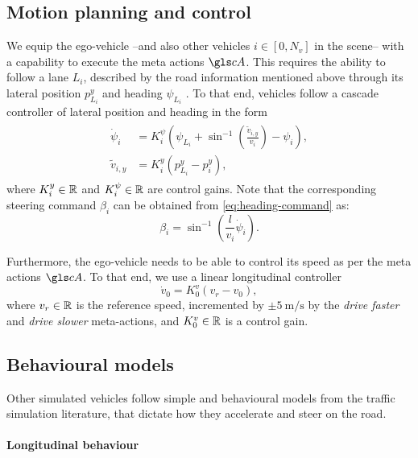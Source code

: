 \subsection{Motion planning and control}

We equip the ego-vehicle --and also other vehicles $i\in[0, N_v]$ in the scene-- with a capability to execute the meta actions $\cA$. This requires the ability to follow a lane $L_i$, described by the road information mentioned above through its lateral position $p^y_{L_i}$ and heading $\psi_{L_i}$ . To that end, vehicles follow a cascade controller of lateral position and heading in the form
\begin{align}
\label{eq:heading-command}
\begin{split}
\dot{\psi}_i &= K_i^\psi\left(\psi_{L_i}+\sin^{-1}\left(\frac{\tilde{v}_{i,y}}{v_i}\right)-\psi_i\right),\\
\tilde{v}_{i,y} &= K_i^y (p^y_{L_i}-p^y_i),
\end{split}
\end{align}
where $K_i^y\in\mathbb{R}$ and $K_i^\psi\in\mathbb{R}$ are control gains.
Note that the corresponding steering command $\beta_i$ can be obtained from \eqref{eq:heading-command} as: $$\beta_i = \sin^{-1}\left(\frac{l}{v_i}\dot{\psi}_i\right).$$

Furthermore, the ego-vehicle needs to be able to control its speed as per the meta actions $\cA$. To that end, we use a linear longitudinal controller
\begin{equation*}
\dot{v}_0 = K_0^v(v_r - v_0),
\end{equation*}
where $v_r\in\mathbb{R}$ is the reference speed, incremented by $\pm \SI[per-mode=symbol]{5}{\meter\per\second}$ by the \emph{drive faster} and \emph{drive slower} meta-actions, and $K_0^v\in\mathbb{R}$ is a control gain.

\subsection{Behavioural models}

Other simulated vehicles follow simple and behavioural models from the traffic simulation literature, that dictate how they accelerate and steer on the road.

\paragraph{Longitudinal behaviour}

